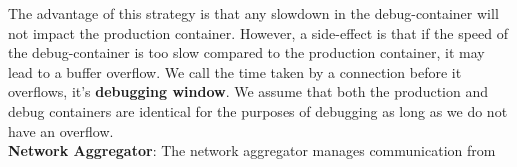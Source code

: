 The advantage of this strategy is that any slowdown in the debug-container will not impact the production container.
However, a side-effect is that if the speed of the debug-container is too slow compared to the production container, it may lead to a buffer overflow. 
We call the time taken by a connection before it overflows, it's \textbf{debugging window}.
We assume that both the production and debug containers are identical for the purposes of debugging as long as we do not have an overflow. \\

\textbf{Network Aggregator}: The network aggregator manages communication from 
	
